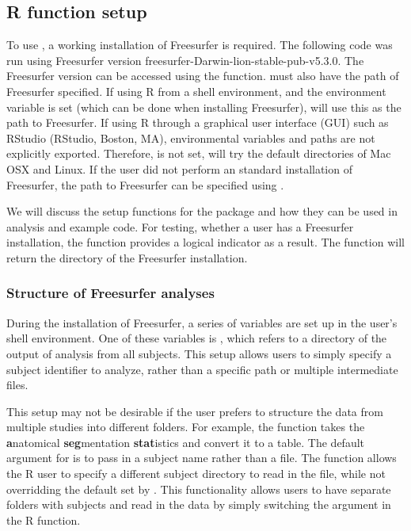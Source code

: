 \subsection{R function setup}\label{r-function-setup}

To use , a working installation of Freesurfer is
required. The following code was run using Freesurfer version
freesurfer-Darwin-lion-stable-pub-v5.3.0. The Freesurfer version can be
accessed using the  function.  must
also have the path of Freesurfer specified. If using R from a shell
environment, and the  environment variable is set
(which can be done when installing Freesurfer),  will
use this as the path to Freesurfer. If using R through a graphical user
interface (GUI) such as RStudio (RStudio, Boston, MA), environmental
variables and paths are not explicitly exported. Therefore,
 is not set,  will try the
default directories of Mac OSX and Linux. If the user did not perform an
standard installation of Freesurfer, the path to Freesurfer can be
specified using .

We will discuss the setup functions for the  package and
how they can be used in analysis and example code. For testing, whether
a user has a Freesurfer installation, the  function
provides a logical indicator as a result. The  function
will return the directory of the Freesurfer installation.

\subsubsection{Structure of Freesurfer
analyses}\label{structure-of-freesurfer-analyses}

During the installation of Freesurfer, a series of variables are set up
in the user's shell environment. One of these variables is
, which refers to a directory of the output of
analysis from all subjects. This setup allows users to simply specify a
subject identifier to analyze, rather than a specific path or multiple
intermediate files.

This setup may not be desirable if the user prefers to structure the
data from multiple studies into different folders. For example, the
 function takes the \textbf{a}natomical
\textbf{seg}mentation \textbf{stat}istics and convert it to a table. The
default argument for  is to pass in a subject name
rather than a file. The   function
allows the R user to specify a different subject directory to read in
the file, while not overridding the default set by .
This functionality allows users to have separate folders with subjects
and read in the data by simply switching the  argument
in the R function.

